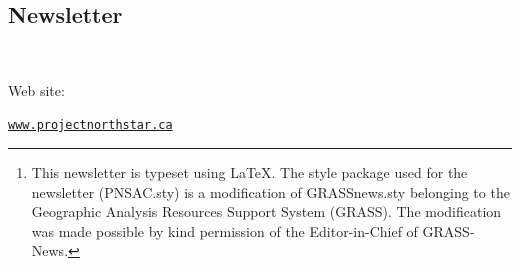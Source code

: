 \address{Roger Button, BA. MA. LLB.\\
Corporate Secretary\\
}

\address{Paul Labranche\\
Treasurer\\
}

  
\subsection{Newsletter}

\address{Editor: Bruce Grant}

\address{Typesetter: Drew Hodge}








\address{PNSAC Newsletter\footnote{This newsletter is typeset using \LaTeX.  The style package used for the newsletter (PNSAC.sty) is a modification of GRASSnews.sty belonging to the Geographic Analysis Resources Support System (GRASS). The modification was made possible by kind permission of the Editor-in-Chief of GRASS-News.} email address:\\
   -- Attention: Editor}\\
\begin{em}Web site:\end{em} {\normalfont\color{blue}\texttt{\url{www.projectnorthstar.ca}}}\\


